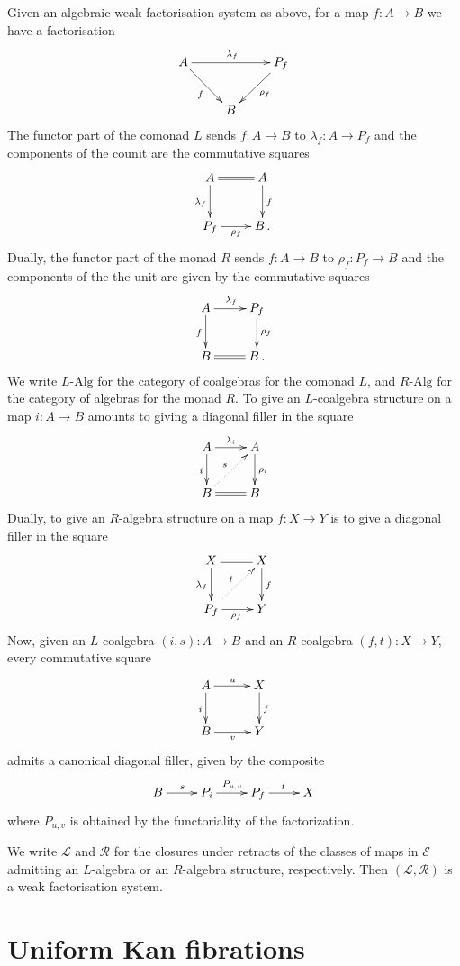 \documentclass[reqno,10pt,a4paper,oneside]{amsart}
\newcommand{\xycenter}[1]{\vcenter{\hbox{\xymatrix{#1}}}}
\newcommand{\catE}{\mathcal{E}}
\newcommand{\RAlg}{R\text{-}\mathrm{Alg}}
\newcommand{\LAlg}{L\text{-}\mathrm{Alg}}
\theoremstyle{definition}
\newcommand{\co}{\colon}
\begin{document}
 
 Given an algebraic weak factorisation system as above, for a map $f \co A \to B$ we have a factorisation
 \[
 \xymatrix{
  A \ar[dr]_f \ar[rr]^{\lambda_f} & & P_f \ar[dl]^{\rho_f} \\
   & B & }
   \]
   The functor part of the comonad $L$ sends $f \co A \to B$ to $\lambda_f \co A \to P_f$ and the components of the counit are  the commutative squares
 \[
 \xymatrix{
 A \ar@{=}[r] \ar[d]_{\lambda_f} & A \ar[d]^f \\
 P_f \ar[r]_{\rho_f} & B \, . }
 \] 
 Dually,   the functor part of the monad $R$ sends $f \co A \to B$ to $\rho_f \co P_f \to B$ and the components of the the unit are given  by the commutative squares
 \[
 \xycenter{
 A  \ar[d]_f \ar[r]^{\lambda_f}  & P_f \ar[d]^{\rho_f} \\
 B \ar@{=}[r] & B \, . }
 \]
 We write  $\LAlg$ for the category of coalgebras for the comonad $L$, and $\RAlg$ for the category of algebras for the monad $R$. 
 To give an $L$-coalgebra structure on a map $i \co A \to B$ amounts
 to giving a diagonal filler in the square
 \[
 \xymatrix{
 A \ar[r]^{\lambda_i}  \ar[d]_{i} & A \ar[d]^{\rho_i} \\
 B \ar@{=}[r]  \ar@{.>}[ur]^s & B }
 \]
 Dually, to give an $R$-algebra structure on a map $f \co X \to Y$ is to give
 a diagonal filler in the square
 \[
 \xymatrix{
 X  \ar@{=}[r]    \ar[d]_{\lambda_f} & X \ar[d]^f \\
 P_f \ar[r]_{\rho_f}  \ar@{.>}[ur]^t & Y }
 \]
Now, given an $L$-coalgebra $(i, s) \co A \to B$ and an $R$-coalgebra $(f, t) \co X \to Y$,
 every commutative square
 \[
\xymatrix@C=1cm{
 A  \ar[d]_i \ar[r]^u  & X \ar[d]^{f}  \\
 B \ar[r]_v & Y}
 \]
  admits a canonical diagonal filler, given by the composite
 \[
 \xymatrix{ B \ar[r]^{s} & P_i \ar[r]^{P_{u,v}} & P_f \ar[r]^{t} & X}
 \]
 where $P_{u,v}$ is obtained by the functoriality of the factorization. 
 
 We write $\mathcal{L}$ and $\mathcal{R}$ for the
 closures under retracts of the classes of maps in $\catE$ admitting an $L$-algebra 
 or an $R$-algebra structure, respectively. Then $(\mathcal{L}, \mathcal{R})$ is
 a weak factorisation system.
 
 
 
\section{Uniform Kan fibrations}
\end{document}
